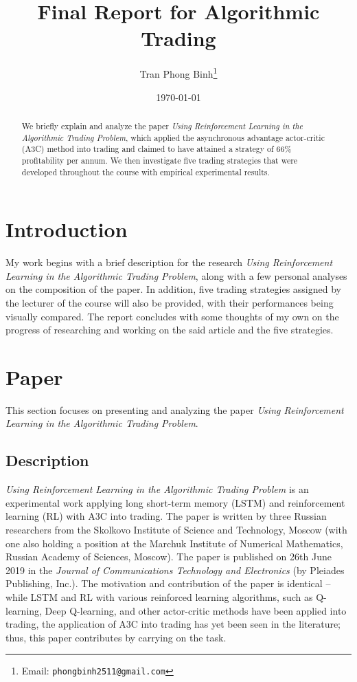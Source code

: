 \documentclass[12pt, letterpaper, oneside]{article}
\title{Final Report for Algorithmic Trading}
\author{Tran Phong Binh\thanks{Email: \texttt{phongbinh2511@gmail.com}}}
\affil{Department of Computer Science and Information Technology,
National Taipei University of Technology, Taipei}
\date{\today}
\begin{document}
\maketitle

\begin{abstract}
We briefly explain and analyze the paper \textit{Using Reinforcement Learning in the Algorithmic Trading Problem}\cite{a3c_trading}, which applied the asynchronous advantage actor-critic (A3C) method into trading and claimed to have attained a strategy of 66\% profitability per annum. We then investigate five trading strategies that were developed throughout the course with empirical experimental results.
\end{abstract}

\section{Introduction}
My work begins with a brief description for the research \textit{Using Reinforcement Learning in the Algorithmic Trading Problem}, along with a few personal analyses on the composition of the paper. In addition, five trading strategies assigned by the lecturer of the course will also be provided, with their performances being visually compared. The report concludes with some thoughts of my own on the progress of researching and working on the said article and the five strategies.

\section{Paper}
This section focuses on presenting and analyzing the paper \textit{Using Reinforcement Learning in the Algorithmic Trading Problem}.

\subsection{Description}
\textit{Using Reinforcement Learning in the Algorithmic Trading Problem} is an experimental work applying long short-term memory (LSTM) and reinforcement learning (RL) with A3C into trading. The paper is written by three Russian researchers from the Skolkovo Institute of Science and Technology, Moscow (with one also holding a position at the Marchuk Institute of Numerical Mathematics, Russian Academy of Sciences, Moscow). The paper is published on 26th June 2019 in the \textit{Journal of Communications Technology and Electronics} (by Pleiades Publishing, Inc.). The motivation and contribution of the paper is identical -- while LSTM and RL with various reinforced learning algorithms, such as Q-learning\cite{q_learning}, Deep Q-learning\cite{deep}, and other actor-critic methods\cite{ac1, ac2} have been applied into trading, the application of A3C into trading has yet been seen in the literature; thus, this paper contributes by carrying on the task.
\end{document}
